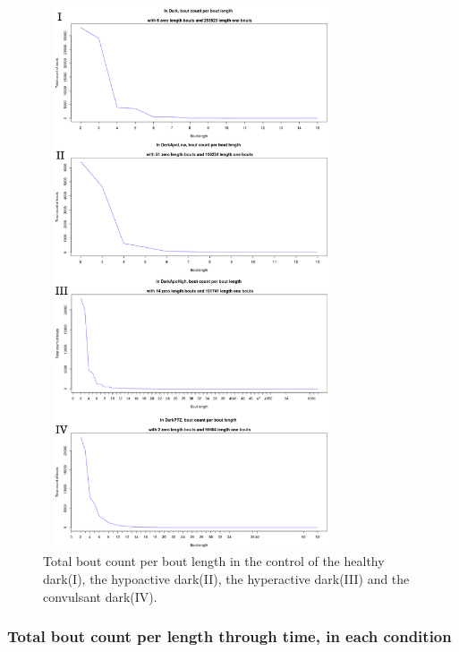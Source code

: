 \documentclass[a4paper,12pt]{article}
\begin{document}
\begin{figure}[h!]
\begin{center}
\includegraphics[width=9cm,height=16cm]{TotalBoutCount.png}
\caption{Total bout count per bout length in the control of the healthy dark(I), the hypoactive dark(II), the hyperactive dark(III) and the convulsant dark(IV).}
\end{center}
\end{figure}

\subsubsection{Total bout count per length through time, in each condition}
\end{document}
